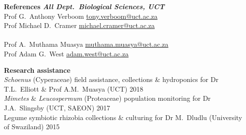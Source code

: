 \documentclass[10pt]{article}
\begin{document}
\begin{multicols}{2}
\end{multicols} %

\begin{multicols}{2}
\textbf{References %
        \hfill {\small \textmd{\textit{All Dept.~Biological Sciences, UCT}}}} \\ 
Prof G.~Anthony Verboom
      \hfill     \href{mailto:tony.verboom@uct.ac.za}{tony.verboom@uct.ac.za} \\
Prof Michael D.~Cramer
      \hfill \href{mailto:michael.cramer@uct.ac.za}{michael.cramer@uct.ac.za} \\
\columnbreak
\ \\
Prof A.~Muthama Muasya
      \hfill \href{mailto:muthama.muasya@uct.ac.za}{muthama.muasya@uct.ac.za} \\
Prof Adam G.~West
      \hfill           \href{mailto:adam.west@uct.ac.za}{adam.west@uct.ac.za} \\
\end{multicols}

\textbf{Research assistance} \\ %
\textit{Schoenus} (Cyperaceae)
  field assistance, collections \& hydroponics
  for Dr T.L.~Elliott \& Prof A.M.~Muasya
  {\small (UCT)}                                         \hfill {\small 2018} \\
\textit{Mimetes} \& \textit{Leucospermum} (Proteaceae)
  population monitoring
  for Dr J.A.~Slingsby
  {\small (UCT, SAEON)}                                  \hfill {\small 2017} \\
Legume symbiotic rhizobia
  collections \& culturing
  for Dr M.~Dludlu
  {\small (University of Swaziland)}                     \hfill {\small 2015} \\
\end{document}
